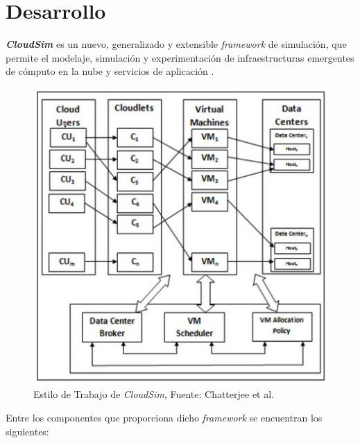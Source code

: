 \documentclass[jou,apacite]{apa6}
\begin{document}
\section{Desarrollo}

 \textit{\textbf{CloudSim}} es un nuevo, generalizado y extensible \textit{framework} de simulaci\'on, que permite el modelaje, simulaci\'on y experimentaci\'on de infraestructuras emergentes de c\'omputo en la nube y servicios de aplicaci\'on \cite{calheiros2011cloudsim}.


\renewcommand\thefigure{\arabic{figure}}
\begin{figure}[h!]
	\centering
	\includegraphics[scale=0.5]{media/imagenuno}
	\caption{Estilo de Trabajo de \textit{CloudSim}, Fuente: Chatterjee et al.}
	\label{fig:TrabajoCloudsim}
	
\end{figure}

Entre los componentes que proporciona dicho \textit{framework} se encuentran los siguientes:
\end{document}
